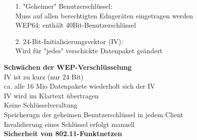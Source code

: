 \documentclass{scrreprt}
\begin{document}
\begin{itemize}
	\item [1.] "Geheimer" Benutzerschlüssel:
	\\Muss auf allen berechtigten Edngeräten eingetragen werden
	\\WEP64: enthält 40Bit-Benutzerschlüssel
	\item [2.] 24-Bit-Initialisierungsvektor (IV):
	\\Wird für "jedes" verschickte Datenpaket geändert
\end{itemize}
\textbf{Schwächen der WEP-Verschlüsselung}
\\IV ist zu kurz (nur 24 Bit)
\\\tab ca. alle 16 Mio Datenpakete wiederholt sich der IV
\\\tab IV wird im Klartext übertragen
\\Keine Schlüsselveraltung
\\\tab Speicherugn der geheimen Benutzerschlüssel in jedem Client
\\\tab Invalidierung eines Schlüssel erfolgt manuell
\\\textbf{Sicherheit von 802.11-Funktnetzen}
\end{document}
